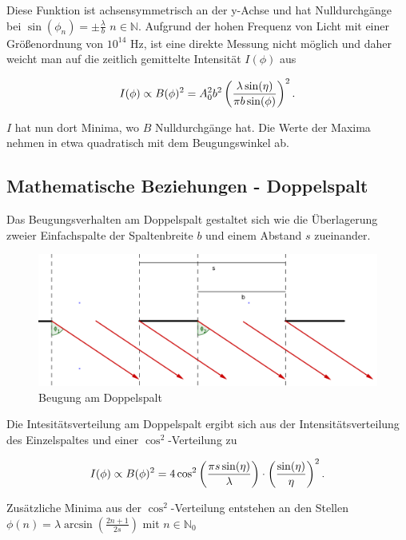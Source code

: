 Diese Funktion ist achsensymmetrisch an der y-Achse und hat Nulldurchgänge bei $\sin(\phi_n) = \pm  \frac{\lambda}{b}$ \quad {} \quad $n \in \mathbb {N}$.
Aufgrund der hohen Frequenz von Licht mit einer Größenordnung von $10^{14}$ Hz, ist eine direkte Messung nicht möglich und
daher weicht man auf die zeitlich gemittelte Intensität $I(\phi)$ aus

\begin{align*}
 I(\phi) \propto B(\phi)^2 = A_0^2 b^2 \left( \frac{\lambda \sin(\eta)}{\pi b \sin(\phi)} \right)^2.
\notag
\end{align*}


$I$ hat nun dort Minima, wo $B$ Nulldurchgänge hat. Die Werte der Maxima nehmen in etwa quadratisch mit dem Beugungswinkel ab.

\subsection{Mathematische Beziehungen - Doppelspalt}
Das Beugungsverhalten am Doppelspalt gestaltet sich wie die Überlagerung zweier Einfachspalte der Spaltenbreite $b$ und einem Abstand $s$ zueinander.


\begin{figure}[htbp]
\includegraphics[width=1\textwidth]{pics/406_2.png}
\centering
\caption {Beugung am Doppelspalt}
\end{figure}


Die Intesitätsverteilung am Doppelspalt ergibt sich aus der Intensitätsverteilung des Einzelspaltes und einer $\cos^2$-Verteilung zu

\begin{align*}
 I(\phi) \propto B(\phi)^2 = 4 \cos^2 \left( \frac{\pi s \sin(\eta)}{\lambda} \right) \cdot \left(\frac{\sin(\eta)}{\eta} \right)^2.
\notag
\end{align*}

Zusätzliche Minima aus der $\cos^2$-Verteilung entstehen an den Stellen $\phi(n)= \lambda \arcsin(\frac{2n+1}{2s})$ mit $n \in \mathbb{N}_0$

